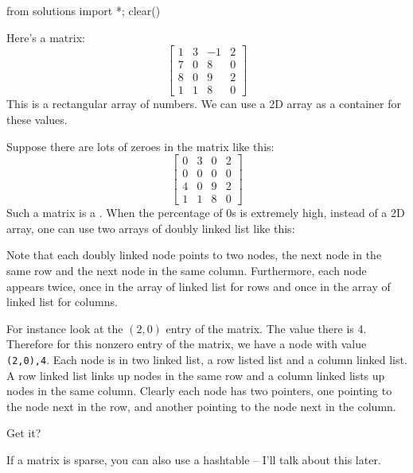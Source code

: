 \begin{python0}
from solutions import *; clear()
\end{python0}

Here's a matrix:
\[
\begin{bmatrix}
1 & 3 & -1 & 2 \\
7 & 0 & 8 & 0 \\
8 & 0 & 9 & 2 \\
1 & 1 & 8 & 0 
\end{bmatrix}
\]
This is a rectangular array of numbers.
We can use a 2D array as a container for these values.

Suppose there are lots of zeroes in the matrix like this:
\[
\begin{bmatrix}
0 & 3 & 0 & 2 \\
0 & 0 & 0 & 0 \\
4 & 0 & 9 & 2 \\
1 & 1 & 8 & 0 
\end{bmatrix}
\]
Such a matrix is a .
When the percentage of 0s is extremely high, instead of a 2D array,
one can use two arrays of doubly linked list like this:



Note that each doubly linked node points to two nodes, the next node in the same row and
the next node in the same column.
Furthermore, each node appears twice, once in the array of linked list for rows
and once in the array of linked list for columns.

For instance look at the $(2,0)$ entry of the matrix. The value there is 4.
Therefore for this nonzero entry of the matrix,
we have a node with value \texttt{(2,0),4}.
Each node is in two linked list, a row listed list and a column linked list.
A row linked list links up nodes in the same row
and a column linked lists up nodes in the same column.
Clearly each node has two pointers, one pointing to the node
next in the row, and another pointing to the node next in the column.

Get it?

If a matrix is sparse, you can also use a hashtable -- I'll talk about
this later.
